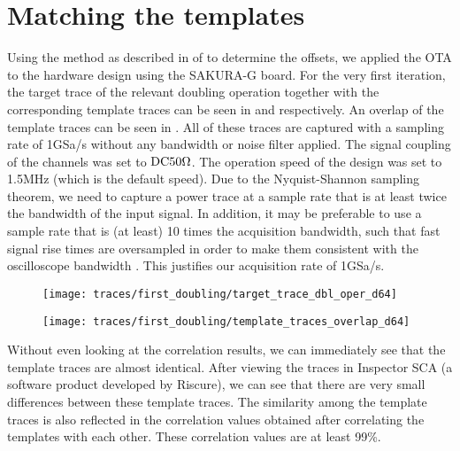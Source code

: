 \section{Matching the templates} \label{sec: Matching the templates}
Using the method as described in  of  to determine the offsets, we applied the OTA to the {\fourq} hardware design using the SAKURA-G board.
For the very first iteration, the target trace of the relevant doubling operation together with the corresponding template traces can be seen in  and  respectively.
An overlap of the template traces can be seen in .
All of these traces are captured with a sampling rate of 1GSa/s without any bandwidth or noise filter applied.
The signal coupling of the channels was set to $\mathrm{DC}50\ohm$.
The operation speed of the {\fourq} design was set to 1.5MHz (which is the default speed).
Due to the Nyquist-Shannon sampling theorem, we need to capture a power trace at a sample rate that is at least twice the bandwidth of the input signal. 
In addition, it may be preferable to use a sample rate that is (at least) 10 times the acquisition bandwidth, such that fast signal rise times are oversampled in order to make them consistent with the oscilloscope bandwidth \cite{waverunner6manual}.
This justifies our acquisition rate of 1GSa/s.
%
\begin{figure}
	\centering
	\texttt{[image: traces/first\_doubling/target\_trace\_dbl\_oper\_d64]}
	\label{fig: OTA first iteration target example}
\end{figure}
%
\begin{figure}
	\centering
	\texttt{[image: traces/first\_doubling/template\_traces\_overlap\_d64]}
	\label{fig: OTA first iteration template traces overlap}
\end{figure}
%
Without even looking at the correlation results, we can immediately see that the template traces are almost identical. 
After viewing the traces in Inspector SCA (a software product developed by Riscure), we can see that there are very small differences between these template traces.
The similarity among the template traces is also reflected in the correlation values obtained after correlating the templates with each other.
These correlation values are at least 99\%.

